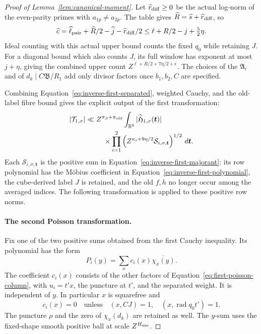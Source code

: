 \documentclass[12pt]{article}
\begin{document}
\begin{proof}[Proof of Lemma~\ref{lem:canonical-moment}]
Let \(\widehat r_{\rm diff}\ge0\) be the actual log-norm of the
even-parity primes with \(a_{1p}\ne a_{2p}\).  The table gives
\(\widehat R=\widehat s+\widehat r_{\rm diff}\), so
\begin{equation}\label{eq:fixed-cube-count}
 \widehat c=\widehat\ell_{\rm pair}+\widehat R/2-\widehat j
                  -\widehat r_{\rm diff}/2
 \le\ell+R/2-j+\tfrac52\eta.
\end{equation}
Ideal counting with this actual upper bound counts the fixed \(q_0\)
while retaining \(J\).  For a diagonal bound which also counts \(J\),
its full window has exponent at most \(j+\eta\), giving the combined
upper count \(Z^{\ell+R/2+7\eta/2+\epsilon}\).  The choices of the
\(\mathfrak A_i\) and of \(d_k\mid C\mathfrak B/R_1\) add only
divisor factors once \(b_1,b_2,C\) are specified.

Combining Equation~\eqref{eq:inverse-first-separated}, weighted Cauchy,
and the old-label fibre bound gives the explicit output of the first
transformation:
\begin{equation}\label{eq:inverse-first-transform-output}
 \begin{split}
 |\mathcal T_{1,\sigma}|\ll{}&Z^{\pi_\beta+\pi_{\rm old}}
 \int_{\mathbb R^9}|\widehat{\mathfrak H}_{1,\sigma}(\boldsymbol t)|\\
 &\quad\times\prod_{i=1}^2
 \left(Z^{\kappa_i+9\eta/2}\mathcal S_{i,\sigma,\boldsymbol t}\right)^{1/2}
 \,d\boldsymbol t.
 \end{split}
\end{equation}
Each \(\mathcal S_{i,\sigma,\boldsymbol t}\) is the positive sum in
Equation~\eqref{eq:inverse-first-majorant}: its row polynomial has the
M\"obius coefficient in Equation~\eqref{eq:inverse-first-polynomial},
the cube-derived label \(J\) is retained, and the old \(f,h\) no longer
occur among the averaged indices. The following transformation is applied
to these positive row norms.

\paragraph{The second Poisson transformation.}
Fix one of the two positive sums obtained from the first Cauchy
inequality.  Its polynomial has the form
\[
 P_i(y)=\sum_x c_i(x)\overline{\chi_x(y)}.
\]
The coefficient \(c_i(x)\) consists of the other factors of
Equation~\eqref{eq:first-poisson-column}, with \(u_i=t'x\), the
puncture at \(t'\), and the separated weight.  It is independent of
\(y\).  In particular \(x\) is squarefree and
\[
 c_i(x)=0\quad\text{unless}\quad
 (x,CJ)=1,\quad (x,\operatorname{rad}q_0t')=1.
\]
The puncture \(\rho\) and the zero of \(\chi_x(d_k)\) are retained
as well.  The \(y\)-sum uses the fixed-shape smooth positive ball at
scale \(Z^{H_{\rm use}}\).


\end{proof}
\end{document}
